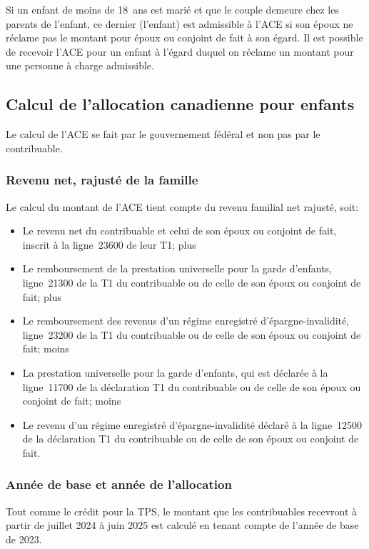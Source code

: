 Si un enfant de moins de 18~ans est marié et que le couple demeure chez les parents de l'enfant, ce dernier (l'enfant) est admissible à l'ACE si son époux ne réclame pas le montant pour époux ou conjoint de fait à son égard. Il est possible de recevoir l'ACE pour un enfant à l'égard duquel on réclame un montant pour une personne à charge admissible.


\subsection{Calcul de l'allocation canadienne pour enfants}
Le calcul de l'ACE se fait par le gouvernement fédéral et non pas par le contribuable.

\subsubsection{Revenu net, rajusté de la famille}
Le calcul du montant de l'ACE tient compte du revenu familial net
rajusté, soit:
\begin{itemize}
	\item Le revenu net du contribuable et celui de son époux ou conjoint de fait, inscrit à la ligne~23600 de leur T1; plus
	\item Le remboursement de la prestation universelle pour la garde d'enfants, ligne~21300 de la T1 du contribuable ou de celle de son époux ou conjoint de fait; plus
	\item Le remboursement des revenus d'un régime enregistré d'épargne-invalidité, ligne~23200 de la T1 du contribuable ou de celle de son époux ou conjoint de fait; moins
	\item La prestation universelle pour la garde d'enfants, qui est déclarée à la ligne~11700 de la déclaration T1 du contribuable ou de celle de son époux ou conjoint de fait; moins
	\item Le revenu d'un régime enregistré d'épargne-invalidité déclaré à la ligne~12500 de la déclaration T1 du contribuable ou de celle de son époux ou conjoint de fait.
\end{itemize}

\subsubsection{Année de base et année de l'allocation}
Tout comme le crédit pour la TPS, le montant que les contribuables recevront à partir de juillet 2024 à juin 2025 est calculé en tenant compte de l'année de base de 2023. 

